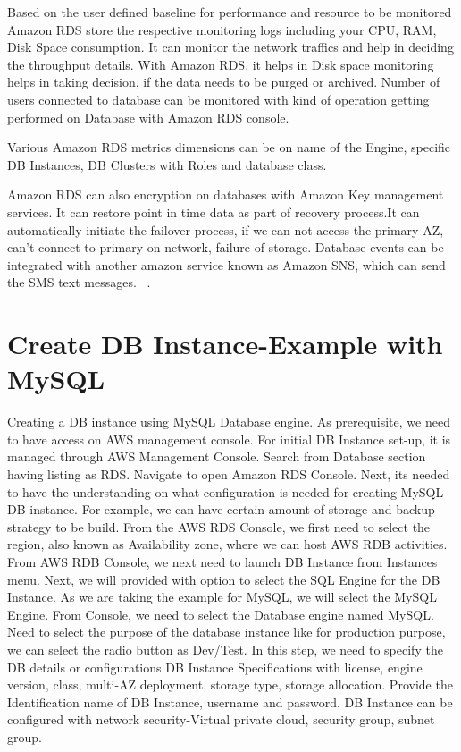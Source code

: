 Based on the user defined baseline for performance and resource to be monitored 
Amazon RDS store the respective monitoring logs including your CPU, RAM, Disk 
Space consumption. It can monitor the network traffics and help in deciding 
the throughput details. With Amazon RDS, it helps in Disk space monitoring 
helps in taking decision, if the data needs to be purged or archived.
Number of users connected to database can be monitored with kind of operation 
getting performed on Database with Amazon RDS console.  

Various Amazon RDS metrics dimensions can be on name of the Engine, specific 
DB Instances, DB Clusters with Roles and database class. 

Amazon RDS can also encryption on databases with Amazon Key management services. 
It can restore point in time data as part of recovery process.It can 
automatically initiate the failover process, if we can not access the 
primary AZ, can't connect to primary on network, failure of storage.
Database events can be integrated with another amazon service known as
Amazon SNS, which can send the SMS text messages.
~\cite{hid-sp18-520-amardsmon}.

\section{Create DB Instance-Example with MySQL}
Creating a DB instance using MySQL Database engine.
As prerequisite, we need to have access on AWS management console.
For initial DB Instance set-up, it is managed through AWS Management
Console.
Search from Database section having listing as RDS.
Navigate to open Amazon RDS Console.
Next, its needed to have the understanding on what configuration is needed 
for creating MySQL DB instance. For example, we can have certain amount of 
storage and backup strategy to be build.
From the AWS RDS Console, we first need to select the region, also 
known as Availability zone, where we can host AWS RDB activities.
From AWS RDB Console, we next need to launch DB Instance from 
Instances menu.
Next, we will provided with option to select the SQL Engine for the DB 
Instance. As we are taking the example for MySQL, we will select the 
MySQL Engine.
From Console, we need to select the Database engine named MySQL.
Need to select the purpose of the database instance like for 
production purpose, we can select the radio button as Dev/Test.
In this step, we need to specify the DB details or configurations
DB Instance Specifications with license, engine version, class, multi-AZ 
deployment, storage type, storage allocation.
Provide the Identification name of DB Instance, username and password.
DB Instance can be configured with network security-Virtual private 
cloud, security group, subnet group.

